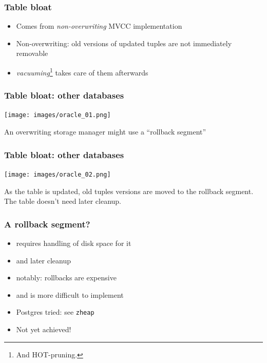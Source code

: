 \begin{frame}
  \frametitle{Table bloat}
  \begin{itemize}
    \item Comes from \emph{non-overwriting} MVCC implementation
    \item Non-overwriting: old versions of updated tuples are not immediately removable
    \item \emph{vacuuming}\footnote{And HOT-pruning.} takes care of them afterwards
  \end{itemize}
\end{frame}

\begin{frame}
  \frametitle{Table bloat: other databases}
  \texttt{[image: images/oracle\_01.png]}

  An overwriting storage manager might use a ``rollback segment''
\end{frame}

\begin{frame}
  \frametitle{Table bloat: other databases}
  \texttt{[image: images/oracle\_02.png]}

  As the table is updated, old tuples versions are moved to the rollback segment. The table doesn't need later cleanup.
\end{frame}

\begin{frame}
  \frametitle{A rollback segment?}
  \begin{itemize}
    \item requires handling of disk space for it
    \item and later cleanup
    \item notably: rollbacks are expensive
    \item<2> and is more difficult to implement
    \item<2> Postgres tried: see \texttt{zheap}
    \item<2> Not yet achieved!
  \end{itemize}
\end{frame}



